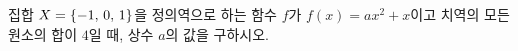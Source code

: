 \hspace*{2mm}\begin{minipage}[t]{\dimexpr\linewidth-2mm\relax}\vspace{0pt}
집합 $X=\{-1,\mkern3mu 0,\mkern3mu 1\}$을 정의역으로 하는 함수 $f$가 $f(x)=ax^2+x$이고 치역의 모든 원소의 합이 $4$일 때, 상수 $a$의 값을 구하시오.\end{minipage}
